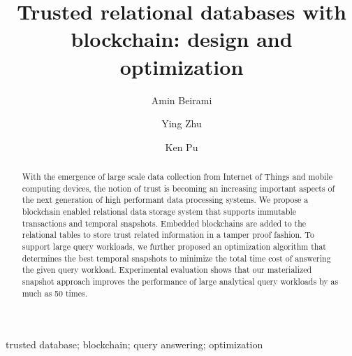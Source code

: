 \title{Trusted relational databases with blockchain: design and optimization}


\author[a]{Amin Beirami}
\author[b]{Ying Zhu}
\author[a]{Ken Pu}

\address[a]{Faculty of Science, UOIT, Oshawa, ON, Canada}
\address[b]{Faculty of Business and IT, UOIT, Oshawa, ON, Canada}

\begin{abstract}
    With the emergence of large scale data collection from Internet of Things
    and mobile computing devices, the notion of trust is becoming an increasing
    important aspects of the next generation of high performant data processing
    systems. We propose a blockchain enabled relational data storage system that
    supports immutable transactions and temporal snapshots.  Embedded
    blockchains are added to the relational tables to store trust related
    information in a tamper proof fashion.
    To support large query workloads, we further proposed an optimization
    algorithm that determines the best temporal snapshots to minimize the total
    time cost of answering the given query workload. Experimental evaluation
    shows that our materialized snapshot approach improves the performance of
    large analytical query workloads by as much as 50 times.
\end{abstract}

\begin{keyword}
    trusted database; blockchain; query answering; optimization
\end{keyword}
